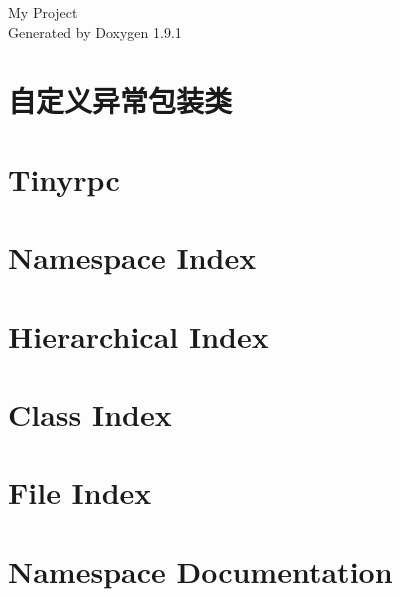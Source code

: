 \let\mypdfximage\pdfximage\def\pdfximage{\immediate\mypdfximage}\documentclass[twoside]{book}
\newcommand{\+}{\discretionary{\mbox{\scriptsize$\hookleftarrow$}}{}{}}
\newcommand{\clearemptydoublepage}{%
  \newpage{\pagestyle{empty}\cleardoublepage}%
}
\begin{document}
\raggedbottom

\hypersetup{pageanchor=false,
             bookmarksnumbered=true,
             pdfencoding=unicode
            }
\begin{titlepage}
\vspace*{7cm}
\begin{center}%
{\Large My Project }\\
\vspace*{1cm}
{\large Generated by Doxygen 1.9.1}\\
\end{center}
\end{titlepage}
\clearemptydoublepage
{}
\tableofcontents
\clearemptydoublepage
{}
\hypersetup{pageanchor=true}

\chapter{自定义异常包装类}
\label{index}\hypertarget{index}{}
\chapter{Tinyrpc}
\label{md_README}

\chapter{Namespace Index}

\chapter{Hierarchical Index}

\chapter{Class Index}

\chapter{File Index}

\chapter{Namespace Documentation}



\end{document}
